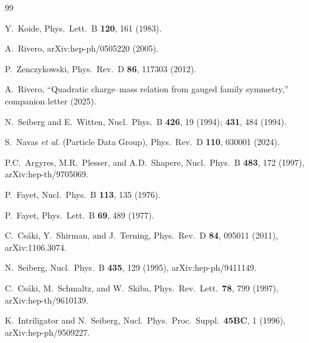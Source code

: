\documentclass[preprint,12pt]{elsarticle}
\begin{document}
\begin{thebibliography}{99}

  Y.~Koide,
  Phys.\ Lett.\ B \textbf{120}, 161 (1983).

  A.~Rivero,
  arXiv:hep-ph/0505220 (2005).

  P.~Zenczykowski,
  Phys.\ Rev.\ D \textbf{86}, 117303 (2012).

  A.~Rivero, ``Quadratic charge--mass relation from gauged
  family symmetry,'' companion letter (2025).

  N.~Seiberg and E.~Witten,
  Nucl.\ Phys.\ B \textbf{426}, 19 (1994);
  \textbf{431}, 484 (1994).

  S.~Navas \textit{et al.} (Particle Data Group),
  Phys.\ Rev.\ D \textbf{110}, 030001 (2024).

  P.C.~Argyres, M.R.~Plesser, and A.D.~Shapere,
  Nucl.\ Phys.\ B \textbf{483}, 172 (1997),
  arXiv:hep-th/9705069.

  P.~Fayet,
  Nucl.\ Phys.\ B \textbf{113}, 135 (1976).

  P.~Fayet,
  Phys.\ Lett.\ B \textbf{69}, 489 (1977).

  C.~Cs\'aki, Y.~Shirman, and J.~Terning,
  Phys.\ Rev.\ D \textbf{84}, 095011 (2011),
  arXiv:1106.3074.

  N.~Seiberg,
  Nucl.\ Phys.\ B \textbf{435}, 129 (1995),
  arXiv:hep-ph/9411149.

  C.~Cs\'aki, M.~Schmaltz, and W.~Skiba,
  Phys.\ Rev.\ Lett.\ \textbf{78}, 799 (1997),
  arXiv:hep-th/9610139.

  K.~Intriligator and N.~Seiberg,
  Nucl.\ Phys.\ Proc.\ Suppl.\ \textbf{45BC}, 1 (1996),
  arXiv:hep-ph/9509227.

\end{thebibliography}
\end{document}
